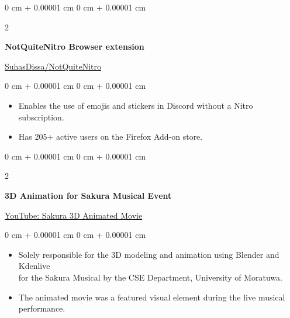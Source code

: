 \documentclass[10pt, letterpaper]{article}
\newenvironment{highlights}{
	\begin{itemize}[
		topsep=0.10 cm,
		parsep=0.10 cm,
		partopsep=0pt,
		itemsep=0pt,
		leftmargin=0 cm + 10pt
		]
	}{
	\end{itemize}
} %
\newenvironment{onecolentry}{
	\begin{adjustwidth}{
			0 cm + 0.00001 cm
		}{
			0 cm + 0.00001 cm
		}
	}{
	\end{adjustwidth}
} %
\newenvironment{twocolentry}[2][]{
	\onecolentry
	\def\secondColumn{#2}
	\setcolumnwidth{\fill, 4.5 cm}
	\begin{paracol}{2}
	}{
		\switchcolumn \raggedleft \secondColumn
	\end{paracol}
	\endonecolentry
} %
\begin{document}
	\begin{twocolentry}{\href{https://github.com/SuhasDissa/NotQuiteNitro}{SuhasDissa/NotQuiteNitro}}
		\textbf{NotQuiteNitro Browser extension}
	\end{twocolentry}
	\vspace{0.10 cm}
	\begin{onecolentry}
		\begin{highlights}
			\item Enables the use of emojis and stickers in Discord without a Nitro subscription.
			\item Has 205+ active users on the Firefox Add-on store.
		\end{highlights}
	\end{onecolentry}
	
	\vspace{0.5 cm}
	
	\begin{twocolentry}{\href{https://www.youtube.com/watch?v=appDAUeFnWI}{YouTube: Sakura 3D Animated Movie}}
		\textbf{3D Animation for Sakura Musical Event}
	\end{twocolentry}
	\vspace{0.10 cm}
	\begin{onecolentry}
		\begin{highlights}
			\item Solely responsible for the 3D modeling and animation using Blender and Kdenlive\\
			for the Sakura Musical by the CSE Department, University of Moratuwa.
			\item The animated movie was a featured visual element during the live musical performance.
		\end{highlights}
	\end{onecolentry}
	
	\vspace{0.5 cm}
	
\end{document}
